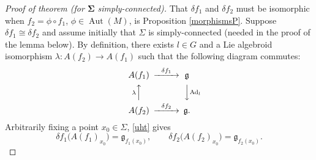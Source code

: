 \documentclass[11pt]{article}
\numberwithin{equation}{section}
\numberwithin{equation}{section}
\DeclareMathOperator{\Adjoint}{Ad}
\DeclareMathOperator{\automorphism}{Aut}
\begin{document}
%
\begin{proof}[Proof of theorem (for $\boldsymbol{\Sigma}$ simply-connected)] That
$\delta f_1$ and $\delta f_2$ must be isomorphic when $f_2 = \phi
\circ f_1 $, $\phi \in \automorphism(M)$, is Proposition
\ref{morphismsP}. Suppose $\delta f_1 \cong\delta f_2$ and assume
initially that $\Sigma $ is simply-connected (needed in the proof of
the lemma below). By definition, there exists $l \in G$ and a Lie
algebroid isomorphism $\lambda \colon A(f_2) \rightarrow A(f_1)$ such
that the following diagram commutes:
\begin{gather}
 \begin{CD} A(f_1) @>{\delta f_1}>> {\mathfrak g} \\ @A{\lambda}AA
@VV{\Adjoint_l}V \\ A(f_2) @>{\delta f_2}>> {\mathfrak g}.\label{cod}
 \end{CD}
\end{gather}
Arbitrarily fixing a point $x_0 \in \Sigma$,
\eqref{uht} gives
\begin{equation}
\delta f_1\big(A(f_1)_{x_0}\big) = {\mathfrak g}_{f_1(x_0)},\qquad
\delta f_2\big(A(f_2)_{x_0}\big) = {\mathfrak g}_{f_2(x_0)}.\label{hws}
\end{equation}


\end{proof}
\end{document}
